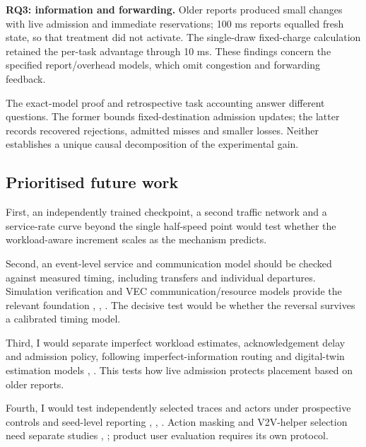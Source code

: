 \documentclass[12pt,a4paper]{article}
\begin{document}
\textbf{RQ3: information and forwarding.} Older reports produced small changes with live admission and immediate reservations; 100 ms reports equalled fresh state, so that treatment did not activate. The single-draw fixed-charge calculation retained the per-task advantage through 10 ms. These findings concern the specified report/overhead models, which omit congestion and forwarding feedback.

The exact-model proof and retrospective task accounting answer different questions. The former bounds fixed-destination admission updates; the latter records recovered rejections, admitted misses and smaller losses. Neither establishes a unique causal decomposition of the experimental gain.

\FloatBarrier
\subsection{Prioritised future work}\label{sec:4.4}

First, an independently trained checkpoint, a second traffic network and a service-rate curve beyond the single half-speed point would test whether the workload-aware increment scales as the mechanism predicts.

Second, an event-level service and communication model should be checked against measured timing, including transfers and individual departures. Simulation verification and VEC communication/resource models provide the relevant foundation \cite{ref21}, \cite{ref31}, \cite{ref6}. The decisive test would be whether the reversal survives a calibrated timing model.

Third, I would separate imperfect workload estimates, acknowledgement delay and admission policy, following imperfect-information routing and digital-twin estimation models \cite{ref18}, \cite{ref30}. This tests how live admission protects placement based on older reports.

Fourth, I would test independently selected traces and actors under prospective controls and seed-level reporting \cite{ref25}, \cite{ref26}, \cite{ref39}. Action masking and V2V-helper selection need separate studies \cite{ref32}, \cite{ref40}; product user evaluation requires its own protocol.
\end{document}

